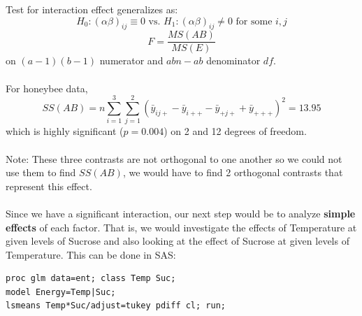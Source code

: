 Test for interaction effect generalizes as:
$$ H_0: (\alpha \beta)_{ij} \equiv 0 \mbox{ vs. }  H_1: (\alpha \beta)_{ij} \neq 0 \mbox{ for some } i,j$$
$$ F=\frac{MS(AB)}{MS(E)}$$
on $(a-1)(b-1)$ numerator and $abn-ab$ denominator $df$.  \\~\\

For honeybee data, 
$$ SS(AB) = n \sum_{i=1}^3 \sum_{j=1}^2 (\bar{y}_{ij+} - \bar{y}_{i++} - \bar{y}_{+j+} + \bar{y}_{+++} )^2 = 13.95 $$
which is highly significant ($p=0.004$) on 2 and 12 degrees of freedom.\\~\\
Note:  These three contrasts are not orthogonal to one another so we could not use them to find $SS(AB)$, we would have to find 2 orthogonal contrasts that represent this effect.\\~\\

Since we have a significant interaction, our next step would be to analyze \textbf{simple effects} of each factor.  That is, we would investigate the effects of Temperature at given levels of Sucrose and also looking at the effect of Sucrose at given levels of Temperature.  This can be done in SAS:

\begin{small}
\begin{verbatim}
proc glm data=ent; class Temp Suc;
model Energy=Temp|Suc;
lsmeans Temp*Suc/adjust=tukey pdiff cl; run;
\end{verbatim}
\end{small}

